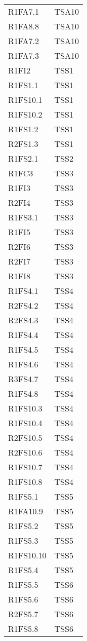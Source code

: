 {\begin{longtable}{C{4cm} C{4cm}}
R1FA7.1 & TSA10  \\
R1FA8.8 & TSA10  \\
R1FA7.2 & TSA10  \\
R1FA7.3 & TSA10  \\


R1FI2 & TSS1\\
R1FS1.1 & TSS1 \\
R1FS10.1 & TSS1 \\
R1FS10.2 & TSS1 \\
R1FS1.2 & TSS1 \\
R2FS1.3 & TSS1 \\
R1FS2.1 & TSS2 \\
R1FC3 & TSS3 \\
R1FI3 & TSS3 \\
R2FI4 & TSS3 \\
R1FS3.1 & TSS3 \\
R1FI5 & TSS3 \\
R2FI6 & TSS3 \\
R2FI7 & TSS3 \\
R1FI8 & TSS3 \\
R1FS4.1 & TSS4 \\
R2FS4.2 & TSS4 \\
R2FS4.3 & TSS4 \\
R1FS4.4 & TSS4 \\
R1FS4.5 & TSS4 \\
R1FS4.6 & TSS4 \\
R3FS4.7 & TSS4 \\
R1FS4.8 & TSS4 \\
R1FS10.3 & TSS4 \\
R1FS10.4 & TSS4 \\
R2FS10.5 & TSS4 \\
R2FS10.6 & TSS4 \\
R1FS10.7 & TSS4 \\
R1FS10.8 & TSS4 \\
R1FS5.1 & TSS5 \\
R1FA10.9 & TSS5 \\
R1FS5.2 & TSS5 \\
R1FS5.3 & TSS5 \\
R1FS10.10 & TSS5 \\
R1FS5.4 & TSS5 \\
R1FS5.5 & TSS6 \\
R1FS5.6 & TSS6 \\
R2FS5.7 & TSS6 \\
R1FS5.8 & TSS6 \\

\end{longtable}}
